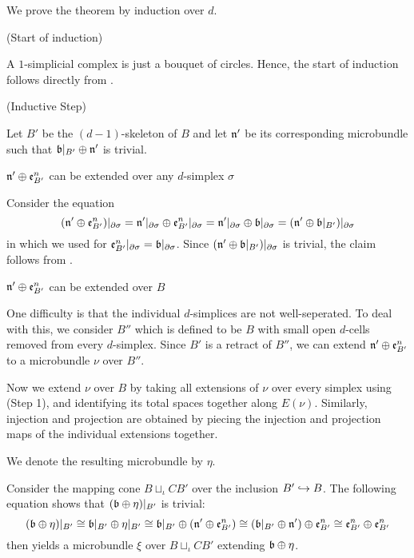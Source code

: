 \begin{myproof}
    We prove the theorem by induction over $d$.

    (Start of induction)

    A $1$-simplicial complex is just a bouquet of circles.
    Hence, the start of induction follows directly from .   

    (Inductive Step)

    Let $B'$ be the $(d - 1)$-skeleton of $B$ and let $\mathfrak{n}'$ be its corresponding microbundle
    such that $\whitney{\bb[B']}{\bn'}$ is trivial.

    \begin{steps}
        \item $\mathfrak{n}' \oplus{} \mathfrak{e}^{n}_{B'}$ can be extended over any $d$-simplex $\sigma$

        Consider the equation
        \[
            (\whitney{\bn'}{\be{B'}})\restr{\partial\sigma}
            = \whitney{\bn'\restr{\partial\sigma}}{\be{B'}\restr{\partial\sigma}}
            = \whitney{\bn'\restr{\partial\sigma}}{\bb[\partial\sigma]}
            = (\whitney{\bn'}{\bb[B']})\restr{\partial\sigma}
        \]
        in which we used 
        for $\be{B'}\restr{\partial\sigma} = \bb[\partial\sigma]$.
        Since $(\whitney{\bn'}{\bb[B']})\restr{\partial\sigma}$ is trivial, the claim follows from .

        \item $\mathfrak{n}' \oplus{} \mathfrak{e}^{n}_{B'}$ can be extended over $B$

        One difficulty is that the individual $d$-simplices are not well-seperated.
        To deal with this, we consider $B''$ which is defined to be $B$
        with small open $d$-cells removed from every $d$-simplex.
        Since $B'$ is a retract of $B''$, we can extend $\mathfrak{n}' \oplus{} \mathfrak{e}^{n}_{B'}$ to a microbundle $\nu$ over $B''$.

        Now we extend $\nu$ over $B$ by taking all extensions of $\nu$
        over every simplex
        using (Step 1), and identifying its total spaces together along $E(\nu)$.
        Similarly, injection and projection are obtained
        by piecing the injection and projection maps of the individual extensions together.

        We denote the resulting microbundle by $\eta$.

        \item \blankbreak{}
        Consider the mapping cone $B \sqcup_\iota CB'$ over the inclusion $B' \hookrightarrow{} B$.
        The following equation shows that $(\whitney{\bb}{\eta})\restr{B'}$ is trivial:
        \[
            (\whitney{\bb}{\eta})\restr{B'}
            \cong \whitney{\bb[B']}{\eta\restr{B'}}
            \cong \whitney{\bb[B']}{(\whitney{\bn'}{\be{B'}})}
            \cong \whitney{(\whitney{\bb[B']}{\bn'})}{\be{B'}}
            \cong \whitney{\be{B'}}{\be{B'}}
        \]
         then yields a microbundle $\xi$ over $B \sqcup_\iota CB'$
        extending $\whitney{\bb}{\eta}$.


\end{steps}
\end{myproof}
